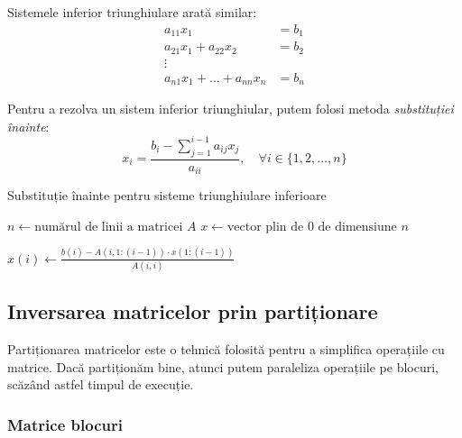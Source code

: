 \documentclass{exam}
\newcommand{\octavescript}[2]{
	
}
\begin{document}
Sistemele inferior triunghiulare arată similar:
\begin{align*}
	a_{11} x_1                       & = b_1 \\
	a_{21} x_1 + a_{22} x_2          & = b_2 \\
	\vdots                                   \\
	a_{n1} x_1 + \ldots + a_{nn} x_n & = b_n
\end{align*}

Pentru a rezolva un sistem inferior triunghiular, putem folosi metoda
\textit{substituției înainte}:
\begin{equation}
	x_i = \frac{b_i - \sum_{j = 1}^{i - 1}{a_{ij} x_j}}{a_{ii}}, \quad \forall i \in \{1, 2, \ldots, n\}
\end{equation}


\begin{algorithm}
	\caption{Substituție înainte pentru sisteme triunghiulare inferioare}
	\begin{algorithmic}[1]
		\State \( n \gets \text{numărul de linii a matricei } A \)
		\State \( x \gets \text{vector plin de 0 de dimensiune } n \)

		\State \( x(i) \gets \frac{b(i) - A(i, 1:(i-1)) \cdot x(1:(i-1))}{A(i, i)} \)
		\EndFor

	\end{algorithmic}
\end{algorithm}

\subsection{Inversarea matricelor prin partiționare}

Partiționarea matricelor este o tehnică folosită pentru a simplifica operațiile
cu matrice. Dacă partiționăm bine, atunci putem paraleliza operațiile pe blocuri,
scăzând astfel timpul de execuție.

\subsubsection{Matrice blocuri}
\end{document}
